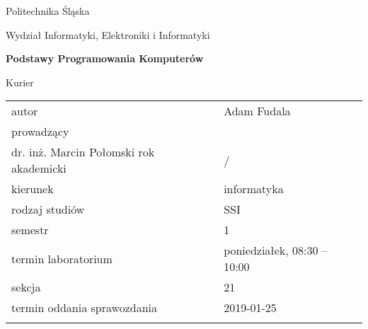\documentclass[12pt,a4paper,twoside]{article}
\newcounter{rok}
\newcommand{\rokakademicki}{%
   \setcounter{rok}{\number\year}%
   \ifthenelse{\number\month<10}%
   {\addtocounter{rok}{-1}}%
   {}%
   \arabic{rok}/\addtocounter{rok}{1}\arabic{rok}
}
\begin{document}
\frenchspacing
\thispagestyle{empty}
\begin{center}
{\Large\sf Politechnika Śląska   %

Wydział Informatyki, Elektroniki i Informatyki

}

\vfill

 

\vfill\vfill

{\Huge\sffamily\bfseries Podstawy Programowania Komputerów\par}  

\vfill\vfill

{\LARGE\sf Kurier}   


\vfill \vfill\vfill\vfill






\begin{tabular}{ll}
	\toprule
	autor                       & Adam Fudala    \\
	prowadzący                  &  \\dr. inż. Marcin Połomski
	rok akademicki              & \rokakademicki         \\
	kierunek                    & informatyka            \\
	rodzaj studiów              & SSI                    \\
	semestr                     & 1                      \\
	termin laboratorium         & poniedziałek, 08:30 -- 10:00 \\
	sekcja                      & 21            \\
	termin oddania sprawozdania & 2019-01-25            \\
	\bottomrule
	                            &
\end{tabular}

\end{center}

\cleardoublepage

\end{document}

